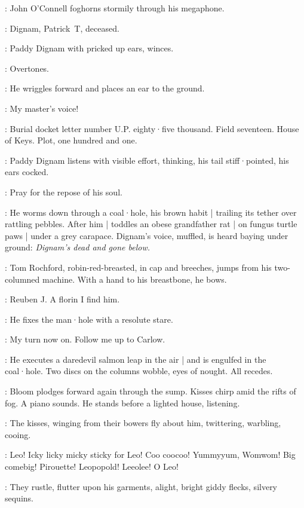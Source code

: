 :
John O'Connell foghorns stormily through his megaphone.

\OConnell:
Dignam,
Patrick~T,
deceased.

:
Paddy Dignam with pricked up ears,
winces.

\Dignam:
Overtones.

:
He wriggles forward and places an ear to the ground.

\Dignam:
My master's voice!

\OConnell:
Burial docket letter number U.P.
eighty·five thousand.
Field seventeen.
House of Keys.
Plot,
one hundred and one.

:
Paddy Dignam listens with visible effort,
thinking,
his tail stiff·pointed,
his ears cocked.

\Dignam:
Pray for the repose of his soul.

:
He worms down through a coal·hole,
his brown habit |
trailing its tether over rattling pebbles.
After him |
toddles an obese grandfather rat |
on fungus turtle paws |
under a grey carapace.
Dignam's voice,
muffled,
is heard baying under ground:
\emph{Dignam's dead and gone below.}

:
Tom Rochford,
robin-red-breasted,
in cap and breeches,
%
jumps from his two-columned machine.
With a hand to his breastbone,
he bows.

\Rochford:
Reuben J.
A florin I find him.

:
He fixes the man·hole with a resolute stare.

\Rochford:
My turn now on.
Follow me up to Carlow.

:
He executes a daredevil salmon leap in the air |
and is engulfed in the coal·hole.
Two discs on the columns wobble,
eyes of nought.
All recedes.

:
Bloom plodges forward again through the sump.
Kisses chirp amid the rifts of fog.
A piano sounds.
He stands before a lighted house,
listening.

:
The kisses,
winging from their bowers fly about him,
twittering,
warbling,
cooing.

\Kisses:
Leo!
Icky licky micky sticky for Leo!
Coo coocoo!
Yummyyum,
Womwom!
Big comebig!
Pirouette!
Leopopold!
Leeolee!
O Leo!

:
They rustle,
flutter upon his garments,
alight,
bright giddy flecks,
silvery sequins.

